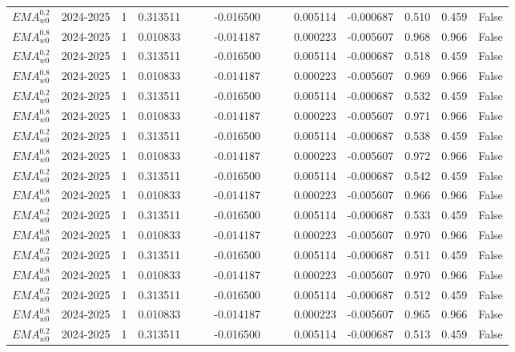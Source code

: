 \begin{tabular}{@{}llrrrrrrrrrlll@{}}
$EMA^{0.2}_{w0}$ & 2024-2025 & 1 & 0.313511 &  &  & -0.016500 &  &  & 0.005114 & -0.000687 & 0.510 & 0.459 & False \\
$EMA^{0.8}_{w0}$ & 2024-2025 & 1 & 0.010833 &  &  & -0.014187 &  &  & 0.000223 & -0.005607 & 0.968 & 0.966 & False \\
$EMA^{0.2}_{w0}$ & 2024-2025 & 1 & 0.313511 &  &  & -0.016500 &  &  & 0.005114 & -0.000687 & 0.518 & 0.459 & False \\
$EMA^{0.8}_{w0}$ & 2024-2025 & 1 & 0.010833 &  &  & -0.014187 &  &  & 0.000223 & -0.005607 & 0.969 & 0.966 & False \\
$EMA^{0.2}_{w0}$ & 2024-2025 & 1 & 0.313511 &  &  & -0.016500 &  &  & 0.005114 & -0.000687 & 0.532 & 0.459 & False \\
$EMA^{0.8}_{w0}$ & 2024-2025 & 1 & 0.010833 &  &  & -0.014187 &  &  & 0.000223 & -0.005607 & 0.971 & 0.966 & False \\
$EMA^{0.2}_{w0}$ & 2024-2025 & 1 & 0.313511 &  &  & -0.016500 &  &  & 0.005114 & -0.000687 & 0.538 & 0.459 & False \\
$EMA^{0.8}_{w0}$ & 2024-2025 & 1 & 0.010833 &  &  & -0.014187 &  &  & 0.000223 & -0.005607 & 0.972 & 0.966 & False \\
$EMA^{0.2}_{w0}$ & 2024-2025 & 1 & 0.313511 &  &  & -0.016500 &  &  & 0.005114 & -0.000687 & 0.542 & 0.459 & False \\
$EMA^{0.8}_{w0}$ & 2024-2025 & 1 & 0.010833 &  &  & -0.014187 &  &  & 0.000223 & -0.005607 & 0.966 & 0.966 & False \\
$EMA^{0.2}_{w0}$ & 2024-2025 & 1 & 0.313511 &  &  & -0.016500 &  &  & 0.005114 & -0.000687 & 0.533 & 0.459 & False \\
$EMA^{0.8}_{w0}$ & 2024-2025 & 1 & 0.010833 &  &  & -0.014187 &  &  & 0.000223 & -0.005607 & 0.970 & 0.966 & False \\
$EMA^{0.2}_{w0}$ & 2024-2025 & 1 & 0.313511 &  &  & -0.016500 &  &  & 0.005114 & -0.000687 & 0.511 & 0.459 & False \\
$EMA^{0.8}_{w0}$ & 2024-2025 & 1 & 0.010833 &  &  & -0.014187 &  &  & 0.000223 & -0.005607 & 0.970 & 0.966 & False \\
$EMA^{0.2}_{w0}$ & 2024-2025 & 1 & 0.313511 &  &  & -0.016500 &  &  & 0.005114 & -0.000687 & 0.512 & 0.459 & False \\
$EMA^{0.8}_{w0}$ & 2024-2025 & 1 & 0.010833 &  &  & -0.014187 &  &  & 0.000223 & -0.005607 & 0.965 & 0.966 & False \\
$EMA^{0.2}_{w0}$ & 2024-2025 & 1 & 0.313511 &  &  & -0.016500 &  &  & 0.005114 & -0.000687 & 0.513 & 0.459 & False \\

\end{tabular}
